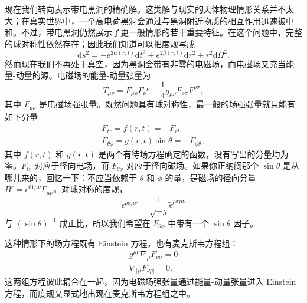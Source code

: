 现在我们转向表示带电黑洞的精确解。这类解与现实的天体物理情形关系并不太大；在真实世界中，一个高电荷黑洞会通过与黑洞附近物质的相互作用迅速被中和。不过，带电黑洞仍然展示了更一般情形的若干重要特征。在这个问题中，完整的球对称性依然存在；因此我们知道可以把度规写成
\begin{equation*}
\mathrm{d}s^{2} = -e^{2\alpha(r,t)}\mathrm{d}t^{2} + e^{2\beta(r,t)}\mathrm{d}r^{2} + r^{2}\mathrm{d}\Omega^{2}.
\tag{6.49}
\end{equation*}
然而现在我们不再处于真空，因为黑洞会带有非零的电磁场，而电磁场又充当能量-动量的源。电磁场的能量-动量张量为
\begin{equation*}
T_{\mu\nu} = F_{\mu\rho}F_{\nu}{}^{\rho} - \frac{1}{4}g_{\mu\nu}F_{\rho\sigma}F^{\rho\sigma},
\tag{6.50}
\end{equation*}
其中 $F_{\mu\nu}$ 是电磁场强张量。既然问题具有球对称性，最一般的场强张量就只能有如下分量
\begin{gather*}
F_{tr} = f(r,t) = -F_{rt}\\
F_{\theta\phi} = g(r,t)\sin\theta = -F_{\phi\theta},
\tag{6.51}
\end{gather*}
其中 $f(r,t)$ 和 $g(r,t)$ 是两个有待场方程确定的函数，没有写出的分量均为零。$F_{tr}$ 对应于径向电场，而 $F_{\theta\phi}$ 对应于径向磁场。如果你正纳闷那个 $\sin\theta$ 是从哪儿来的，回忆一下：不应当依赖于 $\theta$ 和 $\phi$ 的量，是磁场的径向分量 $B^{r}=\epsilon^{01\mu\nu}F_{\mu\nu}$。对球对称的度规，
\begin{equation*}
\epsilon^{\rho\sigma\mu\nu} = \frac{1}{\sqrt{-g}}\tilde{\epsilon}^{\rho\sigma\mu\nu}
\end{equation*}
与 $(\sin\theta)^{-1}$ 成正比，所以我们希望在 $F_{\theta\phi}$ 中带有一个 $\sin\theta$ 因子。

这种情形下的场方程既有 Einstein 方程，也有麦克斯韦方程组：
\begin{gather*}
g^{\mu\nu}\nabla_{\mu}F_{\nu\sigma} = 0\\
\nabla_{[\mu}F_{\nu\rho]} = 0.
\tag{6.52}
\end{gather*}
这两组方程彼此耦合在一起，因为电磁场强张量通过能量-动量张量进入 Einstein 方程，而度规又显式地出现在麦克斯韦方程组之中。

